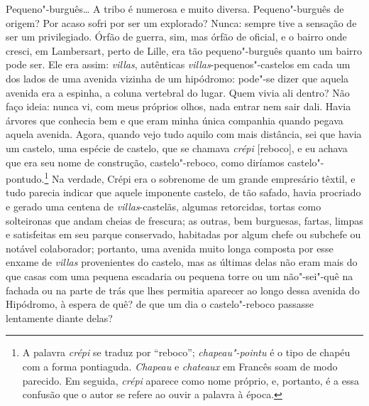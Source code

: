 Pequeno"-burguês\ldots{} A tribo é numerosa e muito diversa. Pequeno"-burguês
de origem? Por acaso sofri por ser um explorado? Nunca: sempre tive a
sensação de ser um privilegiado. Órfão de guerra, sim, mas órfão de
oficial, e o bairro onde cresci, em Lambersart, perto de Lille, era tão
pequeno"-burguês quanto um bairro pode ser. Ele era assim: \emph{villas},
autênticas \emph{villas}-pequenos"-castelos em cada um dos lados de uma
avenida vizinha de um hipódromo: pode"-se dizer que aquela avenida era a
espinha, a coluna vertebral do lugar. Quem vivia ali dentro? Não faço
ideia: nunca vi, com meus próprios olhos, nada entrar nem sair dali.
Havia árvores que conhecia bem e que eram minha única companhia quando
pegava aquela avenida. Agora, quando vejo tudo aquilo com mais
distância, sei que havia um castelo, uma espécie de castelo, que se
chamava \emph{crépi} {[}reboco{]}, e eu achava que era seu nome de
construção, castelo"-reboco, como diríamos castelo"-pontudo.\footnote{A
  palavra \emph{crépi} se traduz por ``reboco''; \emph{chapeau"-pointu} é
  o tipo de chapéu com a forma pontiaguda. \emph{Chapeau} e
  \emph{chateaux} em Francês soam de modo parecido. Em seguida,
  \emph{crépi} aparece como nome próprio, e, portanto, é a essa confusão
  que o autor se refere ao ouvir a palavra à época.} Na verdade, Crépi
era o sobrenome de um grande empresário têxtil, e tudo parecia indicar
que aquele imponente castelo, de tão safado, havia procriado e gerado
uma centena de \emph{villas}-castelãs, algumas retorcidas, tortas como
solteironas que andam cheias de frescura; as outras, bem burguesas,
fartas, limpas e satisfeitas em seu parque conservado, habitadas por
algum chefe ou subchefe ou notável colaborador; portanto, uma avenida
muito longa composta por esse enxame de \emph{villas} provenientes do
castelo, mas as últimas delas não eram mais do que casas com uma pequena
escadaria ou pequena torre ou um não"-sei"-quê na fachada ou na parte de
trás que lhes permitia aparecer ao longo dessa avenida do Hipódromo, à
espera de quê? de que um dia o castelo"-reboco passasse lentamente diante
delas?

